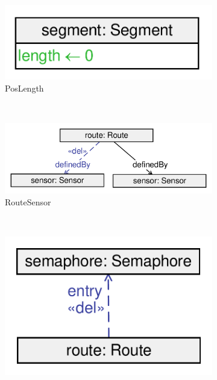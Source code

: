 \begin{figure}
        \centering
        \begin{subfigure}[b]{0.4\textwidth}
        		\centering
                \includegraphics[scale=0.4]{figures/transformation-user-poslength}
                \caption{\textsf{PosLength}}
                \label{fig:transformation-user-poslength}
        \end{subfigure}%
        ~
        \begin{subfigure}[b]{0.6\textwidth}
                \centering
                \includegraphics[scale=0.4]{figures/transformation-user-routesensor}
                \caption{\textsf{RouteSensor}}
                \label{fig:transformation-user-routesensor}
        \end{subfigure}
        ~
        \begin{subfigure}[b]{0.4\textwidth}
                \centering
                \includegraphics[scale=0.4]{figures/transformation-user-semaphoreneighbor}

\end{subfigure}
\end{figure}
